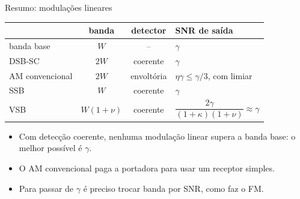 \begin{frame}{Resumo: modulações lineares}

\small
\begin{center}
\begin{tabular}{l c c l}
\toprule
 & banda & detector & SNR de saída \\
\midrule
banda base & $W$ & -- & $\gamma$ \\
\pause
DSB-SC & $2W$ & coerente & $\gamma$ \\
\pause
AM convencional & $2W$ & envoltória & $\eta\gamma \le \gamma/3$, com limiar \\
\pause
SSB & $W$ & coerente & $\gamma$ \\
\pause
VSB & $W(1+\nu)$ & coerente & $\dfrac{2\gamma}{(1+\kappa)(1+\nu)} \approx \gamma$ \\
\bottomrule
\end{tabular}
\end{center}

\begin{itemize}
\item<6-> Com detecção coerente, nenhuma modulação linear supera a banda base: o melhor possível é $\gamma$.
\item<7-> O AM convencional paga a portadora para usar um receptor simples.
\item<8-> Para passar de $\gamma$ é preciso trocar banda por SNR, como faz o FM.
\end{itemize}

\end{frame}

